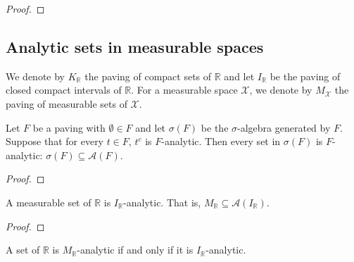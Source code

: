 \begin{proof}\leanok

\end{proof}



\subsection{Analytic sets in measurable spaces}

We denote by $K_{\mathbb{R}}$ the paving of compact sets of $\mathbb{R}$ and let $I_{\mathbb{R}}$ be the paving of closed compact intervals of $\mathbb{R}$.
For a measurable space $\mathcal{X}$, we denote by $M_{\mathcal{X}}$ the paving of measurable sets of $\mathcal{X}$.

\begin{lemma}\label{lem:isPavingAnalytic_of_measurableSet_generateFrom}
  \leanok
Let $F$ be a paving with $\emptyset \in F$ and let $\sigma(F)$ be the $\sigma$-algebra generated by $F$.
Suppose that for every $t \in F$, $t^c$ is $F$-analytic.
Then every set in $\sigma(F)$ is $F$-analytic: $\sigma(F) \subseteq \mathcal{A}(F)$.
\end{lemma}

\begin{proof}\leanok

\end{proof}


\begin{lemma}\label{lem:MeasurableSet.isPavingAnalytic_Icc_real}
  \leanok
A measurable set of $\mathbb{R}$ is $I_{\mathbb{R}}$-analytic.
That is, $M_{\mathbb{R}} \subseteq \mathcal{A}(I_{\mathbb{R}})$.
\end{lemma}

\begin{proof}\leanok

\end{proof}


\begin{lemma}\label{lem:IsPavingAnalytic_measurableSet_iff_isPavingAnalytic_Icc}
  \leanok
A set of $\mathbb{R}$ is $M_{\mathbb{R}}$-analytic if and only if it is $I_{\mathbb{R}}$-analytic.
\end{lemma}

